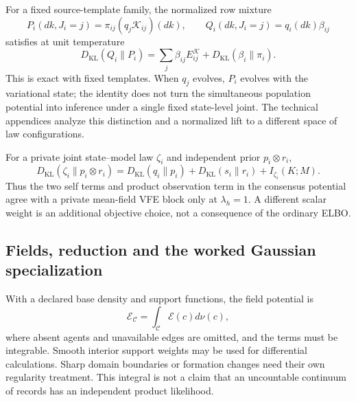 For a fixed source-template family, the normalized row mixture
\begin{equation}
P_i(dk,J_i=j)=\pi_{ij}(q_j\mathcal K_{ij})(dk),\qquad
Q_i(dk,J_i=j)=q_i(dk)\beta_{ij}
\label{eq:mixture_joint}
\end{equation}
satisfies at unit temperature
\begin{equation}
D_{\mathrm{KL}}(Q_i\|P_i)
=\sum_j\beta_{ij}E_{ij}^{\mathcal K}
+D_{\mathrm{KL}}(\beta_i\|\pi_i).
\label{eq:mixture_free_energy}
\end{equation}
This is exact with fixed templates. When $q_j$ evolves, $P_i$ evolves with the variational state; the identity does not turn the simultaneous population potential into inference under a single fixed state-level joint. The technical appendices analyze this distinction and a normalized lift to a different space of law configurations.

For a private joint state--model law $\zeta_i$ and independent prior $p_i\otimes r_i$,
\begin{equation}
D_{\mathrm{KL}}(\zeta_i\|p_i\otimes r_i)
=D_{\mathrm{KL}}(q_i\|p_i)+D_{\mathrm{KL}}(s_i\|r_i)
+I_{\zeta_i}(K;M).
\label{eq:observation_typing_ledger}
\end{equation}
Thus the two self terms and product observation term in the consensus potential agree with a private mean-field VFE block only at $\lambda_h=1$. A different scalar weight is an additional objective choice, not a consequence of the ordinary ELBO.

\subsection{Fields, reduction and the worked Gaussian specialization}
\label{sec:complete_free_energy}
With a declared base density and support functions, the field potential is
\begin{equation}
\mathcal E_{\mathcal C}=\int_{\mathcal C}\mathcal E(c)d\nu(c),
\label{eq:free_energy_functional_final}
\end{equation}
where absent agents and unavailable edges are omitted, and the terms must be integrable. Smooth interior support weights may be used for differential calculations. Sharp domain boundaries or formation changes need their own regularity treatment. This integral is not a claim that an uncountable continuum of records has an independent product likelihood.

